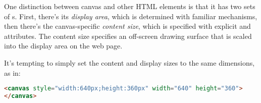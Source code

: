 One distinction between canvas and other HTML elements is that it has two sets of s.  First, there's its \emph{display area}, which is determined with familiar  mechanisms, then there's the canvas-specific \emph{content size}, which is specified with explicit  and  attributes.  The content size specifies an off-screen drawing surface that is scaled into the display area on the web page.

It's tempting to simply set the content and display sizes to the same dimensions, as in:

\begin{lstlisting}[language=HTML]
<canvas style="width:640px;height:360px" width="640" height="360">
</canvas>
\end{lstlisting}

